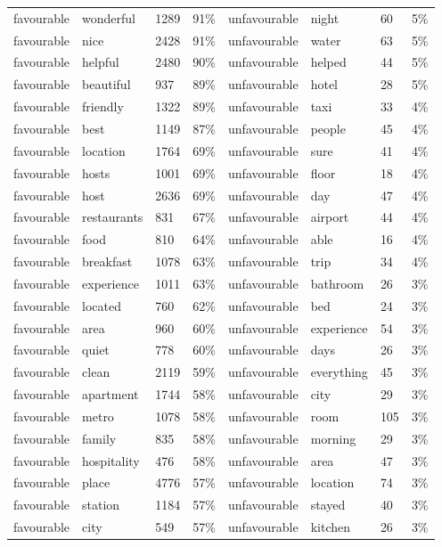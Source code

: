 \documentclass[a4paper, 12pt]{article}
\begin{document}
\begin{longtable}[l]{p{2cm}p{2cm}p{1cm}p{1.6cm}p{2.4cm}p{1.9cm}p{1cm}p{2cm}}
favourable & wonderful & 1289 & 91\% & unfavourable & night & 60 & 5\% \\
favourable & nice & 2428 & 91\% & unfavourable & water & 63 & 5\% \\
favourable & helpful & 2480 & 90\% & unfavourable & helped & 44 & 5\% \\
favourable & beautiful & 937 & 89\% & unfavourable & hotel & 28 & 5\% \\
favourable & friendly & 1322 & 89\% & unfavourable & taxi & 33 & 4\% \\
favourable & best & 1149 & 87\% & unfavourable & people & 45 & 4\% \\
favourable & location & 1764 & 69\% & unfavourable & sure & 41 & 4\% \\
favourable & hosts & 1001 & 69\% & unfavourable & floor & 18 & 4\% \\
favourable & host & 2636 & 69\% & unfavourable & day & 47 & 4\% \\
favourable & restaurants & 831 & 67\% & unfavourable & airport & 44 & 4\% \\
favourable & food & 810 & 64\% & unfavourable & able & 16 & 4\% \\
favourable & breakfast & 1078 & 63\% & unfavourable & trip & 34 & 4\% \\
favourable & experience & 1011 & 63\% & unfavourable & bathroom & 26 & 3\% \\
favourable & located & 760 & 62\% & unfavourable & bed & 24 & 3\% \\
favourable & area & 960 & 60\% & unfavourable & experience & 54 & 3\% \\
favourable & quiet & 778 & 60\% & unfavourable & days & 26 & 3\% \\
favourable & clean & 2119 & 59\% & unfavourable & everything & 45 & 3\% \\
favourable & apartment & 1744 & 58\% & unfavourable & city & 29 & 3\% \\
favourable & metro & 1078 & 58\% & unfavourable & room & 105 & 3\% \\
favourable & family & 835 & 58\% & unfavourable & morning & 29 & 3\% \\
favourable & hospitality & 476 & 58\% & unfavourable & area & 47 & 3\% \\
favourable & place & 4776 & 57\% & unfavourable & location & 74 & 3\% \\
favourable & station & 1184 & 57\% & unfavourable & stayed & 40 & 3\% \\
favourable & city & 549 & 57\% & unfavourable & kitchen & 26 & 3\% \\

\end{longtable}
\end{document}
